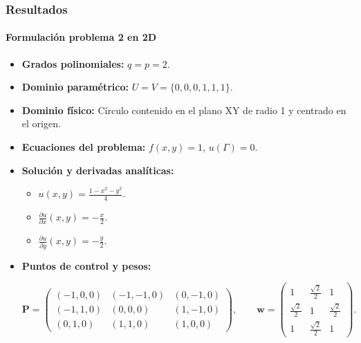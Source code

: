 \documentclass[compress]{beamer}
\begin{document}
\begin{frame}
	\frametitle{Resultados}
	\framesubtitle{Formulación problema 2 en 2D}
		\begin{itemize}
		\item \textbf{Grados polinomiales:} $q=p=2$.
		\item \textbf{Dominio paramétrico:} $U=V=\{0,0,0,1,1,1\}$.
		\item \textbf{Dominio físico:} Círculo contenido en el plano XY de radio 1 y centrado en el origen.
		\item \textbf{Ecuaciones del problema:} $f(x,y)=1$, $u(\Gamma)=0$.
		\item \textbf{Solución y derivadas analíticas:}
		\begin{itemize}
			\item $u(x,y)=\frac{1-x^2-y^2}{4}$.
			\item $\frac{\partial u}{\partial x}(x,y)=-\frac{x}{2}$.
			\item $\frac{\partial u}{\partial y}(x,y)=-\frac{y}{2}$.
		\end{itemize}
		\item \textbf{Puntos de control y pesos:}
		
		\vspace{-10pt}
		{\scriptsize
			\begin{equation*}
				\mathbf{P} = 
				\begin{pmatrix}
					(-1, 0, 0) & (-1, -1, 0) & (0, -1, 0) \\
					(-1, 1, 0) & (0, 0, 0) & (1, -1, 0) \\
					(0, 1, 0) & (1, 1, 0) & (1, 0, 0)
				\end{pmatrix}
				,\qquad
				\mathbf{w}=
				\begin{pmatrix}
					1 & \frac{\sqrt{2}}{2} & 1 \\
					\frac{\sqrt{2}}{2} & 1 & \frac{\sqrt{2}}{2} \\
					1 & \frac{\sqrt{2}}{2} & 1
				\end{pmatrix}
				.
			\end{equation*}
		}
	\end{itemize}
\end{frame}
\end{document}
